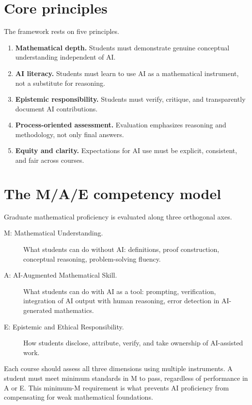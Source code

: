 \documentclass{SIAMbook2023}
\begin{document}
\section{Core principles}

The framework rests on five principles.

\begin{enumerate}
\item \textbf{Mathematical depth.} Students must demonstrate genuine conceptual understanding independent of AI.
\item \textbf{AI literacy.} Students must learn to use AI as a mathematical instrument, not a substitute for reasoning.
\item \textbf{Epistemic responsibility.} Students must verify, critique, and transparently document AI contributions.
\item \textbf{Process-oriented assessment.} Evaluation emphasizes reasoning and methodology, not only final answers.
\item \textbf{Equity and clarity.} Expectations for AI use must be explicit, consistent, and fair across courses.
\end{enumerate}

\section{The M/A/E competency model}

Graduate mathematical proficiency is evaluated along three orthogonal axes.

\begin{description}
\item[M: Mathematical Understanding.] What students can do without AI: definitions, proof construction, conceptual reasoning, problem-solving fluency.
\item[A: AI-Augmented Mathematical Skill.] What students can do with AI as a tool: prompting, verification, integration of AI output with human reasoning, error detection in AI-generated mathematics.
\item[E: Epistemic and Ethical Responsibility.] How students disclose, attribute, verify, and take ownership of AI-assisted work.
\end{description}

Each course should assess all three dimensions using multiple instruments. A student must meet minimum standards in M to pass, regardless of performance in A or E. This minimum-M requirement is what prevents AI proficiency from compensating for weak mathematical foundations.
\end{document}
